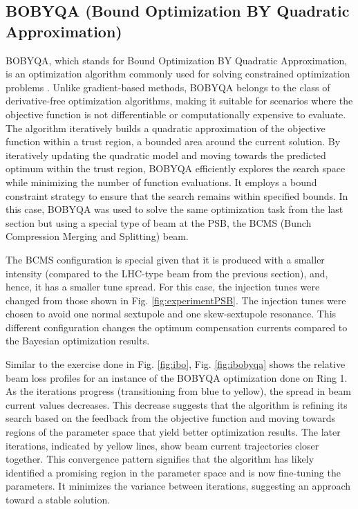\subsection{BOBYQA (Bound Optimization BY Quadratic Approximation)}

BOBYQA, which stands for Bound Optimization BY Quadratic Approximation, is an optimization algorithm commonly used for solving constrained optimization problems \cite{bobyqa}. Unlike gradient-based methods, BOBYQA belongs to the class of derivative-free optimization algorithms, making it suitable for scenarios where the objective function is not differentiable or computationally expensive to evaluate. The algorithm iteratively builds a quadratic approximation of the objective function within a trust region, a bounded area around the current solution. By iteratively updating the quadratic model and moving towards the predicted optimum within the trust region, BOBYQA efficiently explores the search space while minimizing the number of function evaluations. It employs a bound constraint strategy to ensure that the search remains within specified bounds. In this case, BOBYQA was used to solve the same optimization task from the last section but using a special type of beam at the PSB, the BCMS (Bunch Compression Merging and Splitting) beam. 

The BCMS configuration is special given that it is produced with a smaller intensity (compared to the LHC-type beam from the previous section), and, hence, it has a smaller tune spread. For this case, the injection tunes were changed from those shown in Fig. \ref{fig:experimentPSB}. The injection tunes were chosen to avoid one normal sextupole and one skew-sextupole resonance. This different configuration changes the optimum compensation currents compared to the Bayesian optimization results.

Similar to the exercise done in Fig. \ref{fig:ibo}, Fig. \ref{fig:ibobyqa} shows the relative beam loss profiles for an instance of the  BOBYQA optimization done on Ring 1. As the iterations progress (transitioning from blue to yellow), the spread in beam current values decreases. This decrease suggests that the algorithm is refining its search based on the feedback from the objective function and moving towards regions of the parameter space that yield better optimization results. The later iterations, indicated by yellow lines, show beam current trajectories closer together. This convergence pattern signifies that the algorithm has likely identified a promising region in the parameter space and is now fine-tuning the parameters. It minimizes the variance between iterations, suggesting an approach toward a stable solution.


